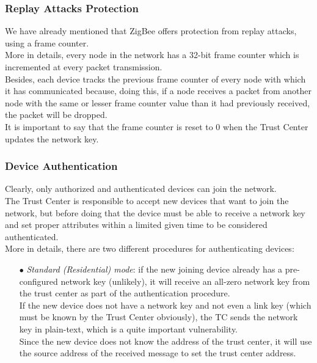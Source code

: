\documentclass[12pt]{report}
\begin{document}
{\subsubsection{Replay Attacks Protection}
\bigskip
We have already mentioned that ZigBee offers protection from replay attacks, using a frame counter.\\
More in details, every node in the network has a 32-bit frame counter which is incremented at every packet transmission.\\
Besides, each device tracks the previous frame counter of every node with which it has communicated because, doing this, if a node receives a packet from another node with the same or lesser frame counter value than it had previously received, the packet will be dropped.\\
It is important to say that the frame counter is reset to 0 when the Trust Center updates the network key.

\subsubsection{Device Authentication}
\bigskip
Clearly, only authorized and authenticated devices can join the network.\\
The Trust Center is responsible to accept new devices that want to join the network, but before doing that the device must be able to receive a network key and set proper attributes within a limited given time to be considered authenticated.\\
More in details, there are two different procedures for authenticating devices:

\begin{itemize}
\setlength{\itemindent}{+4mm}
\item[$\bullet$] \emph{Standard (Residential) mode}: if the new joining device already has a pre-configured network key (unlikely), it will receive an all-zero network key from the trust center as part of the authentication procedure.\\
If the new device does not have a network key and not even a link key (which must be known by the Trust Center obviously), the TC  sends the network key in plain-text, which is a quite important vulnerability.\\
Since the new device does not know the address of the trust center, it will use the source address of the received message to set the trust center address.


\end{itemize}}
\end{document}
